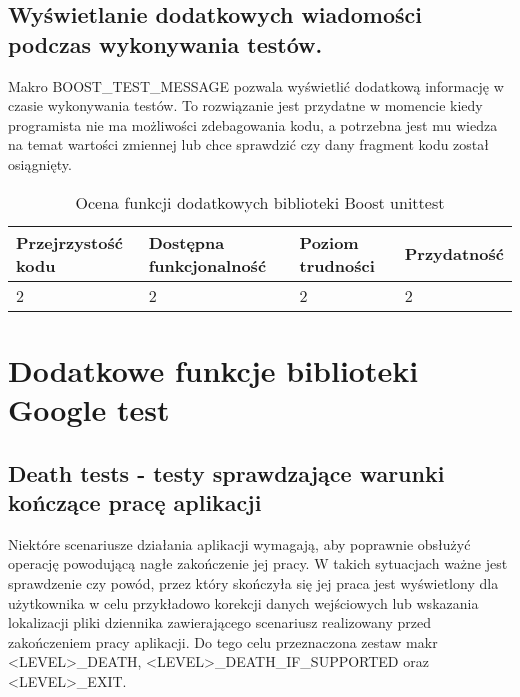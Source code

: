 \documentclass[12pt,a4paper,notitlepage]{report}
\begin{document}
\subsection{Wyświetlanie dodatkowych wiadomości podczas wykonywania testów.}

Makro BOOST{\_}TEST{\_}MESSAGE pozwala wyświetlić dodatkową informację w czasie wykonywania testów. To rozwiązanie jest przydatne w momencie kiedy programista nie ma możliwości zdebagowania kodu, a potrzebna jest mu wiedza na temat wartości zmiennej lub chce sprawdzić czy dany fragment kodu został osiągnięty.

			


\begin{center}
			\begin{table}[!ht]
			\caption{Ocena funkcji dodatkowych biblioteki Boost unittest}
			\label{}
			\begin{tabular}[!hc]{|l|l|l|l|}
		\hline
		Przejrzystość kodu 	&	Dostępna funkcjonalność	&	Poziom trudności	&	Przydatność \\ \hline
		2					&	2						&	2					& 	2  			\\ \hline
			\end{tabular}
			\end{table} 
		\end{center}

\section{Dodatkowe funkcje biblioteki Google test}

\subsection{Death tests - testy sprawdzające warunki kończące pracę aplikacji}

Niektóre scenariusze działania aplikacji wymagają, aby poprawnie obsłużyć operację powodującą nagłe zakończenie jej pracy. W takich sytuacjach ważne jest sprawdzenie czy powód, przez który skończyła się jej praca jest wyświetlony dla użytkownika w celu przykładowo korekcji danych wejściowych lub wskazania lokalizacji pliki dziennika zawierającego scenariusz realizowany przed zakończeniem pracy aplikacji.
Do tego celu przeznaczona zestaw makr <LEVEL>{\_}DEATH, <LEVEL>{\_}DEATH{\_}IF{\_}SUPPORTED oraz <LEVEL>{\_}EXIT. 
\end{document}
